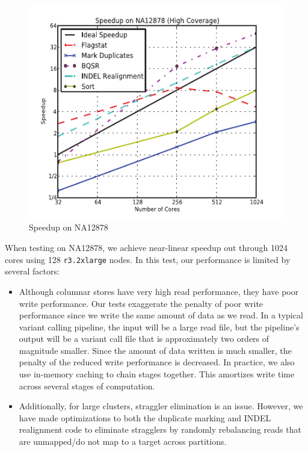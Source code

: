 \documentclass{sig-alternate}
\begin{document}
\begin{figure}[h]
\begin{center}
\includegraphics{graphs/speedup_na12878.pdf}
\end{center}
\caption{Speedup on NA12878}
\label{fig:speedup}
\end{figure}

When testing on NA12878, we achieve near-linear speedup out through 1024 cores using 128
\texttt{r3.2xlarge} nodes. In this test, our performance is limited by several factors:

\begin{itemize}
\item Although columnar stores have very high read performance, they have poor write performance. Our
tests exaggerate the penalty of poor write performance since we write the same amount of data as we read. In a typical
variant calling pipeline, the input will be a large read file, but the pipeline's output will be a
variant call file that is approximately two orders of magnitude smaller. Since the amount of data written is much smaller,
the penalty of the reduced write performance is decreased. In practice, we also use in-memory caching to chain stages
together. This amortizes write time across several stages of computation.
\item Additionally, for large clusters, straggler elimination is an issue. However, we have made optimizations to
both the duplicate marking and INDEL realignment code to eliminate stragglers by randomly
rebalancing reads that are unmapped/do not map to a target across partitions.
\end{itemize}
\end{document}
